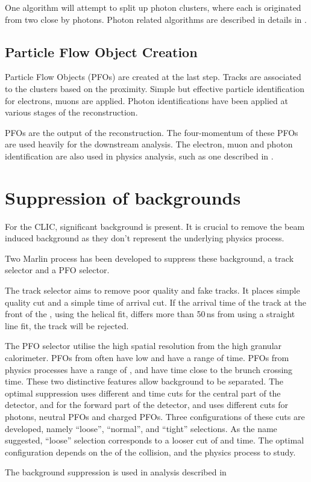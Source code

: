 One algorithm will attempt to split up photon clusters, where each is originated from two close by photons. Photon related algorithms are described in details in .



\subsection{Particle Flow Object Creation}
\label{sec:pandoraPFOcreation}

Particle Flow Objects (PFOs) are created at the last step. Tracks are associated to the clusters based on the proximity. Simple but effective particle identification for electrons, muons are applied. Photon identifications have been applied at various stages of the reconstruction.

PFOs are the output of the \pandora reconstruction. The four-momentum of these PFOs are  used heavily for the downstream analysis. The electron, muon and photon identification are  also used in physics analysis, such as one described in .

\section{Suppression of \ggHad backgrounds}
\label{sec:pandoraggHad}
For the CLIC, significant \ggHad background is present. It is crucial to remove the beam induced background as they don't represent the underlying physics process.

Two Marlin process has been developed to suppress these background, a track selector and a PFO selector\cite{Marshall:2012ry}.

The track selector aims to remove poor quality and fake tracks. It places simple quality cut and a simple time of arrival cut. If the arrival time of the track at the front of the \ECAL, using the helical fit, differs more than 50\,ns from using a straight line fit, the track will be rejected.

The PFO selector utilise the high spatial resolution from the high granular calorimeter. PFOs from \ggHad often have low \pT and have a range of time. PFOs from physics processes have a range of \pT, and have time close to the brunch crossing time. These two distinctive features allow \ggHad background to be separated. The optimal suppression uses different \pT and time cuts for the central part of the detector, and for the forward part of the detector, and uses different cuts for photons, neutral PFOs and charged PFOs. Three configurations of these cuts are developed, namely ``loose'', ``normal'', and ``tight'' selections. As the name suggested, ``loose'' selection corresponds to a looser cut of \pT and time. The optimal configuration depends on the \sqrtS of the collision, and the physics process to study.

The background suppression is used in analysis described in 
